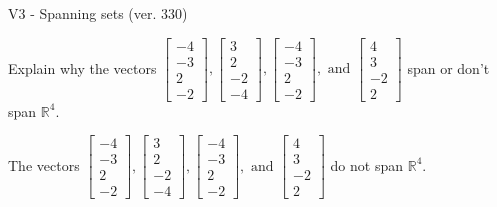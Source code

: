 \begin{exercise}
  \begin{exerciseTitle}V3 - Spanning sets (ver. 330)\end{exerciseTitle}
  \begin{exerciseStatement}
    Explain why the vectors \(\left[\begin{array}{r}
-4 \\
-3 \\
2 \\
-2
\end{array}\right] , \left[\begin{array}{r}
3 \\
2 \\
-2 \\
-4
\end{array}\right] , \left[\begin{array}{r}
-4 \\
-3 \\
2 \\
-2
\end{array}\right] , \text{ and } \left[\begin{array}{r}
4 \\
3 \\
-2 \\
2
\end{array}\right]\) span or don't span \(\mathbb{R}^4\). 
	


  \end{exerciseStatement}
  \begin{exerciseAnswer}
   The vectors \(\left[\begin{array}{r}
-4 \\
-3 \\
2 \\
-2
\end{array}\right] , \left[\begin{array}{r}
3 \\
2 \\
-2 \\
-4
\end{array}\right] , \left[\begin{array}{r}
-4 \\
-3 \\
2 \\
-2
\end{array}\right] , \text{ and } \left[\begin{array}{r}
4 \\
3 \\
-2 \\
2
\end{array}\right]\) 
  	 do not  
	span \(\mathbb{R}^4\).
  


  \end{exerciseAnswer}
\end{exercise}
